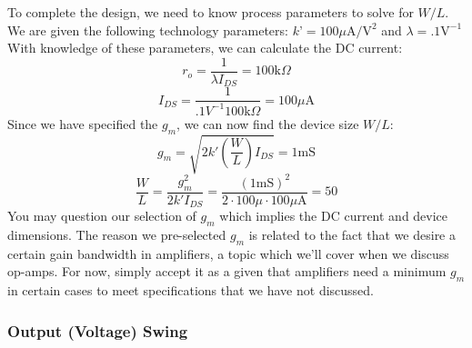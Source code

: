 To complete the design, we need to know process parameters to solve for $W/L$.  We are given the following technology parameters: $k’ = 100 \mu\mathrm{A/V^2}$ and $\lambda = .1\mathrm{V^{-1}}$
%
With knowledge of these parameters, we can calculate the DC current: 
\begin{equation} 
	{r_o} = \frac{1}{{\lambda {I_{DS}}}} = 100\mathrm{k}\Omega 
\end{equation}
%
\begin{equation} 
	{I_{DS}} = \frac{1}{{.1{V^{ - 1}} 100\mathrm{k}\Omega }} = 100\mu \mathrm{A}
\end{equation}
%
Since we have specified the $g_m$, we can now find the device size $W/L$:
%
\begin{equation} 
	{g_m} = \sqrt {2k'\left( {\frac{W}{L}} \right){I_{DS}}}  = 1\mathrm{mS} 
\end{equation}
%
\begin{equation} 
	\frac{W}{L} = \frac{{g_m^2}}{{2k'{I_{DS}}}} = \frac{{{{(1\mathrm{mS})}^2}}}{{2 \cdot 100\mu \cdot 100\mu \mathrm{A}}} = 50 
\end{equation}
%
You may question our selection of $g_m$ which implies the DC current and device dimensions.  The reason we pre-selected $g_m$ is related to the fact that we desire a certain gain bandwidth in amplifiers, a topic which we'll cover when we discuss op-amps.  For now, simply accept it as a given that amplifiers need a minimum $g_m$ in certain cases to meet specifications that we have not discussed.





\subsubsection{Output (Voltage) Swing}

